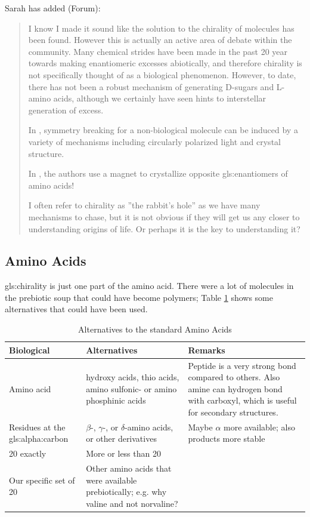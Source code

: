 \documentclass[]{article}
\begin{document}
Sarah has added (Forum):
\begin{quotation}
	I know I made it sound like the solution to the chirality of molecules has been found. However this is actually an active area of debate within the community. Many chemical strides have been made in the past 20 year towards making enantiomeric excesses abiotically, and therefore chirality is not specifically thought of as a biological phenomenon. However, to date, there has not been a robust mechanism of generating D-sugars and L-amino acids, although we certainly have seen hints to interstellar generation of excess.
	
	In \cite{soai2019role}, symmetry breaking for a non-biological molecule can be induced by a variety of mechanisms including circularly polarized light and crystal structure.
	
	In \cite{tassinari2019enantioseparation}, the authors use a magnet to crystallize opposite \glspl{gls:enantiomer} of amino acids!
	
	I often refer to chirality as ''the rabbit's hole'' \cite{carroll1898alice} as we have many mechanisms to chase, but it is not obvious if they will get us any closer to understanding origins of life. Or perhaps it is the key to understanding it?
\end{quotation}

\subsection{Amino Acids}

\Gls{gls:chirality} is just one part of the amino acid. There were a lot of molecules in the prebiotic soup that could have become polymers; Table \ref{table:alternatives} shows some alternatives that could have been used.
\begin{table}[H]
	\newlength\mylength
	\setlength{}
	\caption{Alternatives to the standard Amino Acids}\label{table:alternatives}
	\begin{tabular}{|p{\mylength}| p{\mylength}|p{\mylength}| } \hline
		Biological& Alternatives&Remarks\\ \hline
		Amino acid&	hydroxy acids, thio acids, amino sulfonic- or amino phosphinic acids&Peptide is a very strong bond compared to others. Also amine can hydrogen bond with carboxyl, which is useful for secondary structures. \\ \hline
		Residues at the \gls{gls:alpha:carbon}& $\beta$-, $\gamma$-, or $\delta$-amino acids, or other derivatives&Maybe $\alpha$ more available; also products more stable\\ \hline
		20 exactly& More or less than 20&\\ \hline
		Our specific set of 20 &Other amino acids that were available prebiotically; e.g. why valine and not norvaline?&\\ \hline
	\end{tabular}
\end{table}
\end{document}
